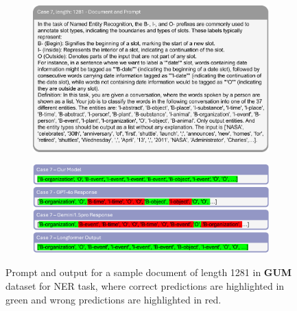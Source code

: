 \documentclass[11pt]{article}
\begin{document}
\begin{figure}[!h]
    \centering
    \begin{subfigure}[b]{1.0\linewidth}   
        \includegraphics[width=\textwidth]{images/case7_prompt.png} 
    \end{subfigure}
    \vspace{1pt}
    \begin{subfigure}[b]{1.0\linewidth}  
        \includegraphics[width=\textwidth]{images/case7_ans.png}
    \end{subfigure}
    \caption{Prompt and output for a sample document of length 1281 in \textbf{GUM} dataset for NER task, where correct predictions are highlighted in green and wrong predictions are highlighted in red.}
    \label{case7}
\end{figure}
\end{document}
